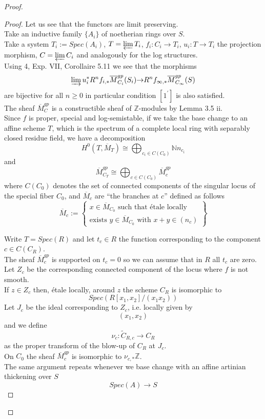 \documentclass{amsart}
\theoremstyle{definition}
\numberwithin{equation}{section}
\begin{document}
\begin{proof}
\begin{proof}
\noindent Let us see that the functors are limit preserving.\\
Take an inductive family $\{A_i\}$ of noetherian rings over $S$.\\
Take a system $T_i:=Spec(A_i)$, $T=\varprojlim T_i$, $f_i:C_i{\rightarrow} T_i$, $u_i:T{\rightarrow} T_i$ the projection morphism, $C=\varprojlim C_i$ and analogously for the log structures.\\
Using \cite{sga} 4, Exp. VII, Corollaire 5.11 we see that the morphisms
$$
\varinjlim u_i^{*}R^nf_{i,*}\overline{M}_{C_i}^{gp}(S_i){\rightarrow} R^nf_{\infty,*}\overline{M}_{C_{\infty}}^{gp}(S)
$$
\noindent are bijective for all $n\geq 0$ in particular condition $[1^{\prime}]$ is also satisfied.\\

\noindent The sheaf $\overline{M}_{C}^{gp}$ is a constructible sheaf of ${\mathbb{Z}}$-modules by \cite{ollog} Lemma 3.5 ii.\\ 

\noindent Since $f$ is proper, special and log-semistable, if we take the base change to an affine scheme $T$, which is the spectrum of a complete local ring with separably closed residue field, we have a decomposition
$$
H^0(T,\overline{M}_{T})\cong \bigoplus_{c_i\in C(C_0)}{\mathbb{N}} n_{c_i}
$$
\noindent and 
$$
\overline{M}_{C_{T}}^{gp}\cong \bigoplus_{c\in C(C_0)}\overline{M}_{c}^{gp} 
$$
\noindent where $C(C_0)$ denotes the set of connected components of the singular locus of the special fiber $C_0$, and $\overline{M}_{c}$ are ``the branches at $c$'' defined as follows
$$
\overline{M}_{c}:=\left\{
\begin{aligned}
x\in \overline{M}_{C_0} \mbox{ such that \'etale locally}\\
\mbox{exists }y\in \overline{M}_{C_0} \mbox{ with } x+y\in (n_c)
\end{aligned}
\right\}
$$

\noindent Write $T=Spec(R)$ and let $t_c\in R$ the function corresponding to the component $c\in C(C_R)$.\\
The sheaf $\overline{M}_{c}^{gp}$ is supported on $t_c=0$ so we can assume that in $R$ all $t_c$ are zero.\\
Let $Z_c$ be the corresponding connected component of the locus where $f$ is not smooth.\\
If $z\in Z_c$ then, \'etale locally, around $z$ the scheme $C_R$ is isomorphic to 
$$
Spec(R[x_1,x_2]/(x_1x_2))
$$
\noindent Let $J_c$ be the ideal corresponding to $Z_c$, i.e. locally given by 
$$(x_1,x_2)$$
\noindent and we define 
$$
\nu_c:\tilde{C}_{R,c}{\rightarrow} C_R
$$
\noindent as the proper transform of the blow-up of $C_R$ at $J_c$.\\
On $C_0$ the sheaf $\overline{M}_c^{gp}$ is isomorphic to $\nu_{c,*}{\mathbb{Z}}$.\\
The same argument repeats whenever we base change with an affine artinian thickening over $S$ 
$$
Spec(A){\rightarrow} S
$$


\end{proof}
\end{proof}
\end{document}
